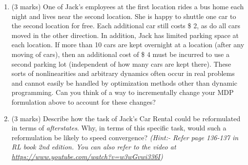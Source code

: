 \documentclass[addpoints,12pt,solution]{exam}
\begin{document}
\begin{questions}
\begin{enumerate}[label=(\alph*)]
\begin{solution}

\end{solution}

\item (3 marks) One of Jack’s employees at the first location rides a bus home each night and lives near the second location. She is happy to shuttle one car to the second location for free. Each additional car still costs \$ 2, as do all cars moved in the other direction. In addition, Jack has limited parking space at each location. If more than 10 cars are kept overnight at a location (after any moving of cars), then an additional cost of \$ 4 must be incurred to use a second parking lot (independent of how many cars are kept there). These sorts of nonlinearities and arbitrary dynamics often occur in real problems and cannot easily be handled by optimization methods other than
dynamic programming. Can you think of a way to incrementally change your MDP formulation above to account for these changes?

\begin{solution}

\end{solution}

\item (3 marks) Describe how the task of Jack’s Car Rental could be reformulated in terms of \textit{afterstates}. Why, in terms of this specific task, would such a reformulation be likely to speed convergence? \textit{(Hint:- Refer page 136-137 in RL book 2nd edition. You can also refer to the video at \href{https://www.youtube.com/watch?v=w3wGvwi336I}{https://www.youtube.com/watch?v=w3wGvwi336I})}

\begin{solution}

\end{solution}

\end{enumerate}


\end{questions}
\end{document}
